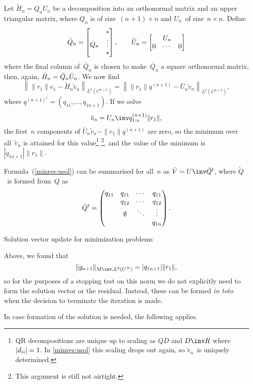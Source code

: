 \documentclass[11pt]{artikel3}
\begin{document}
\begin{Outline}
Let $\tilde H_n=Q_nU_n$ be a decomposition into an orthonormal
matrix and an upper triangular matrix, where $Q_n$ is of 
size~\hbox{$(n+1)\times n$} and $U_n$~of size~\hbox{$n\times n$}.
Define
\[ \bar Q_n = \left[\begin{matrix}&*\cr Q_n&\vdots\cr &*\cr\end{matrix}\right],
        \qquad \bar U_n = \left[\begin{matrix}&U_n\cr 0&\cdots&0\cr\end{matrix} \right] \]
where the final column of~$\bar Q_n$ is chosen to make~$\bar Q_n$
a square orthonormal matrix,
then, again, $\tilde H_n=\nobreak \bar Q_n\bar U_n$.
We now find
\[ \left\| \|r_1\|e_1 - \tilde H_n\tilde v_n \right\|_{L^2(C^{n+1})}
   =\left\| \|r_1\|q^{(n+1)} - \bar U_n\tilde v_n \right\|_{L^2(C^{n+1})}, \]
where $q^{(n+1)^t}=(q_{11},\ldots,q_{1n+1})$.
If we solve
\begin{equation}
        \tilde v_n=U_n\inv q^{(n+1)}_{1:n}\|r_1\|,
        \label{minres:usol}\end{equation}
the first~$n$ components of $\bar U_n\tilde v_n-\|r_1\|q^{(n+1)}$ are zero,
so the minimum over all~$\tilde v_n$ is attained for this value\footnote
{QR decompositions are unique up to scaling as $QD$ and $D\inv R$
where $|d_{ii}|=\nobreak 1$. In \eqref{minres:usol} this scaling
drops out again, so $\tilde v_n$~is uniquely determined.}%
\footnote{This argument is still not airtight.},
and the value of the minimum is~$|q_{1n+1}|\|r_1\|$.

Formula~(\ref{minres:usol}) can be summarised for all~$n$
as $\tilde V=U\inv\tilde Q^t$, where $\tilde Q$~is
formed from~$Q$ as
        \[ \tilde Q^t=\begin{pmatrix}q_{11}&q_{11}&\cdots&q_{11}\cr
                        &q_{12}&\cdots&q_{12}\cr
                        &\emptyset&\ddots&\vdots\cr
                        &&&q_{1n}\end{pmatrix}. \]

 {Solution vector update for minimization problems}

Above, we found that
\[ \|g_{n+1}\|_{M\inv,L^2(C^N)}=|q_{1n+1}|\|r_1\|, \]
so for the purposes of a stopping test on this norm we do not
explicitly need to form the solution vector or the residual.
Instead, these can be formed {\em in toto} when the decision to 
terminate the iteration is made.

In case formation of the solution is needed, the following applies.


\end{Outline}
\end{document}
